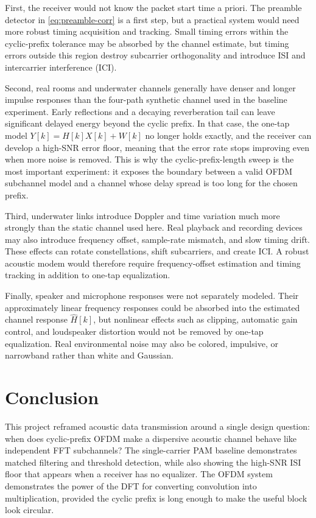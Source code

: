 \documentclass[conference]{IEEEtran}
\begin{document}
First, the receiver would not know the packet start time a priori. The preamble detector in \eqref{eq:preamble-corr} is a first step, but a practical system would need more robust timing acquisition and tracking. Small timing errors within the cyclic-prefix tolerance may be absorbed by the channel estimate, but timing errors outside this region destroy subcarrier orthogonality and introduce ISI and intercarrier interference (ICI).

Second, real rooms and underwater channels generally have denser and longer impulse responses than the four-path synthetic channel used in the baseline experiment. Early reflections and a decaying reverberation tail can leave significant delayed energy beyond the cyclic prefix. In that case, the one-tap model $Y[k]=H[k]X[k]+W[k]$ no longer holds exactly, and the receiver can develop a high-SNR error floor, meaning that the error rate stops improving even when more noise is removed. This is why the cyclic-prefix-length sweep is the most important experiment: it exposes the boundary between a valid OFDM subchannel model and a channel whose delay spread is too long for the chosen prefix.

Third, underwater links introduce Doppler and time variation much more strongly than the static channel used here. Real playback and recording devices may also introduce frequency offset, sample-rate mismatch, and slow timing drift. These effects can rotate constellations, shift subcarriers, and create ICI. A robust acoustic modem would therefore require frequency-offset estimation and timing tracking in addition to one-tap equalization.

Finally, speaker and microphone responses were not separately modeled. Their approximately linear frequency responses could be absorbed into the estimated channel response $\hat{H}[k]$, but nonlinear effects such as clipping, automatic gain control, and loudspeaker distortion would not be removed by one-tap equalization. Real environmental noise may also be colored, impulsive, or narrowband rather than white and Gaussian.

\section{Conclusion}
This project reframed acoustic data transmission around a single design question: when does cyclic-prefix OFDM make a dispersive acoustic channel behave like independent FFT subchannels? The single-carrier PAM baseline demonstrates matched filtering and threshold detection, while also showing the high-SNR ISI floor that appears when a receiver has no equalizer. The OFDM system demonstrates the power of the DFT for converting convolution into multiplication, provided the cyclic prefix is long enough to make the useful block look circular.
\end{document}
